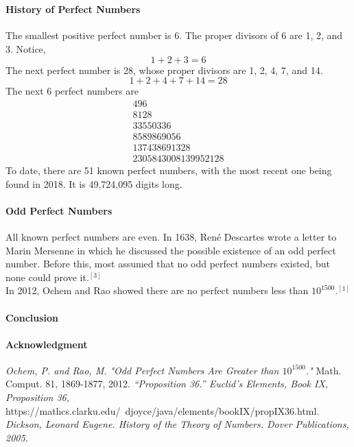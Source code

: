 \\\documentclass[12pt]{article}
\begin{document}
\paragraph*{History of Perfect Numbers}
The smallest positive perfect number is 6. The proper divisors of 6 are 1, 2, and 3. Notice, $$1+2+3=6$$
The next perfect number is 28, whose proper divisors are 1, 2, 4, 7, and 14.
$$1+2+4+7+14=28$$
The next 6 perfect numbers are
 $$\begin{array}{r}
496\\
8128\\
33550336\\
8589869056\\
137438691328\\
2305843008139952128
\end{array}$$
To date, there are 51 known perfect numbers, with the most recent one being found in 2018. It is 49,724,095 digits long.
\paragraph*{Odd Perfect Numbers}
All known perfect numbers are even. In 1638, René Descartes wrote a letter to Marin Mersenne in which he discussed the possible existence of an odd perfect number. Before this, most assumed that no odd perfect numbers existed, but none could prove it.$^{[3]}$ \\
In 2012, Ochem and Rao showed there are no perfect numbers less than $10^{1500}$.$^{[1]}$

\paragraph*{Conclusion}

\paragraph*{Acknowledgment}


\begin{thebibliography}{5}
\textit{Ochem, P. and Rao, M. "Odd Perfect Numbers Are Greater than $10^{1500}$."} Math. Comput. 81, 1869-1877, 2012.
\textit{“Proposition 36.” Euclid's Elements, Book IX, Proposition 36,} https://mathcs.clarku.edu/~djoyce/java/elements/bookIX/propIX36.html.
\textit{Dickson, Leonard Eugene. History of the Theory of Numbers. Dover Publications, 2005.}
\end{thebibliography}
\end{document}
